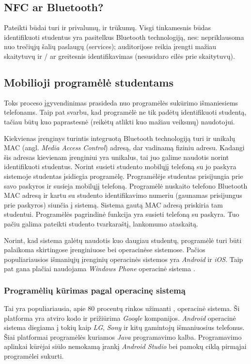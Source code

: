 \documentclass{VUMIFPSkursinis}
\begin{document}
\subsection{NFC ar Bluetooth?}
Pateikti būdai turi ir privalumų, ir trūkumų. Visgi tinkamesnis būdas identifikuoti studentus yra pasitelkus Bluetooth technologiją, nes: nepriklausoma nuo trečiųjų šalių paslaugų (services); auditorijose reikia įrengti mažiau skaitytuvų ir / ar greitesnis identifikavimas (nesusidaro eilės prie skaitytuvų).

\subsection{Mobilioji programėlė studentams} \label{StudentApp}
Toks proceso įgyvendinimas prasideda nuo programėlės sukūrimo išmaniesiems telefonams. Taip pat svarbu, kad programėlė ne tik padėtų identifikuoti studentą, tačiau būtų kuo paprastesnė (reikėtų atlikti kuo mažiau veiksmų) naudotojui.

Kiekvienas įrenginys turintis integruotą Bluetooth technologiją turi ir unikalų MAC (angl. \textit{Media Access Control}) adresą, dar vadinamą fiziniu adresu. Kadangi šis adresas kievienam įrenginiui yra unikalus, tai juo galime naudotis norint identifikuoti studentus. Norint susieti studento mobilųjį telefoną su jo paskyra sistemoje studentas įsidiegia programėlę. Programėlėje studentas prisijungia prie savo paskyros ir susieja mobilųjį telefoną. Programėlė nuskaito telefono Bluetooth MAC adresą ir kartu su studento identifikavimo numeriu (gaunamas prisijungus prie paskyros) siunčia į sistemą. Sistema gautą MAC adresą priskiria tam studentui. Programėlės pagrindinė funkcija yra susieti telefoną su paskyra. Tuo pačiu galima pateikti studento tvarkaraštį, lankomumo ataskaitą.

Norint, kad sistema galėtų naudotis kuo daugiau studentų, programėlė turi būti palaikoma skirtingose įrenginiuose bei operacinėse sistemose. Pačios populiariausios išmaniųjų įrenginių operacinės sistemos yra \textit{Android} ir \textit{iOS}. Taip pat gana plačiai naudojama \textit{Windows Phone} operacinė sistema \cite{MarketShareByOS}.

\subsubsection{Programėlių kūrimas pagal operacinę sistemą}

Tai yra populiariausia, apie 80 procentų rinkos užimanti \cite{MarketShareByOS}, operacinė sistema. Ši platforma yra atviro kodo ir prižiūrima \textit{Google} kompanijos. \textit{Android} operacinė sistema diegiama į tokių kaip \textit{LG}, \textit{Sony} ir kitų gamintojų išmaniuosius telefonus. Šiai platformai programėlės kuriamos \textit{Java} programavimo kalba. Programavimo aplinkai kūrėjai siūlo nemokamą įrankį \textit{Android Studio} bei pamokų ciklą pirmąjai programėlei sukurti.
\end{document}
